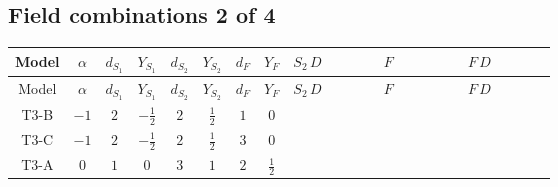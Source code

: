 \documentclass[8pt]{article}
\begin{document}
\begin{landscape}
\subsection*{Field combinations 2 of 4}
\begin{longtable}{@{}cccccccc >{\raggedright\arraybackslash}p{0.21\linewidth} >{\raggedright\arraybackslash}p{0.21\linewidth} >{\raggedright\arraybackslash}p{0.21\linewidth}@{}}
\toprule
Model & $\alpha$ & $d_{S_1}$ & $Y_{S_1}$ & $d_{S_2}$ & $Y_{S_2}$ & $d_F$ & $Y_F$ & $S_2\,D$ & $F$ & $F\,D$ \\
\midrule
\endfirsthead
\toprule
Model & $\alpha$ & $d_{S_1}$ & $Y_{S_1}$ & $d_{S_2}$ & $Y_{S_2}$ & $d_F$ & $Y_F$ & $S_2\,D$ & $F$ & $F\,D$ \\
\midrule
\endhead
T3-B & $-1$ & $2$ & $-\frac{1}{2}$ & $2$ & $\frac{1}{2}$ & $1$ & $0$ & \scriptsize\adjustbox{max width=\linewidth}{$\begin{gathered} +D_{\mu _1}\left(S_{2,j_1}\right){}^{\dagger } D_{\mu _1}\left(S_{2,j_1}\right)\end{gathered}$} & \scriptsize\adjustbox{max width=\linewidth}{$\begin{gathered} -\frac{1}{2} F_{r_1}{}^T\, C\, F_{r_1} M_F\end{gathered}$} & \scriptsize\adjustbox{max width=\linewidth}{$\begin{gathered} +\frac{1}{2} i F_{r_1}{}^T\, C\, \gamma ^{\mu _1}\, D_{\mu _1}\left(F_{r_1}\right)\end{gathered}$} \\
\midrule
T3-C & $-1$ & $2$ & $-\frac{1}{2}$ & $2$ & $\frac{1}{2}$ & $3$ & $0$ & \scriptsize\adjustbox{max width=\linewidth}{$\begin{gathered} +D_{\mu _1}\left(S_{2,j_1}\right){}^{\dagger } D_{\mu _1}\left(S_{2,j_1}\right)\end{gathered}$} & \scriptsize\adjustbox{max width=\linewidth}{$\begin{gathered} -\frac{1}{2} F_{j_1,r_1}{}^T\, C\, F_{j_1,r_1} M_F\end{gathered}$} & \scriptsize\adjustbox{max width=\linewidth}{$\begin{gathered} +\frac{1}{2} i F_{j_1,r_1}{}^T\, C\, \gamma ^{\mu _1}\, D_{\mu _1}\left(F_{j_1,r_1}\right)\end{gathered}$} \\
\midrule
T3-A & $0$ & $1$ & $0$ & $3$ & $1$ & $2$ & $\frac{1}{2}$ & \scriptsize\adjustbox{max width=\linewidth}{$\begin{gathered} +D_{\mu _1}\left(S_{2,j_1}\right){}^{\dagger } D_{\mu _1}\left(S_{2,j_1}\right)\end{gathered}$} & \scriptsize\adjustbox{max width=\linewidth}{$\begin{gathered} -\overline{F_{j_1,r_1}}\, F_{j_1,r_1} M_F\end{gathered}$} & \scriptsize\adjustbox{max width=\linewidth}{$\begin{gathered} +i \overline{F_{j_1,r_1}}\, \gamma ^{\mu _1}\, D_{\mu _1}\left(F_{j_1,r_1}\right)\end{gathered}$} \\

\end{longtable}
\end{landscape}
\end{document}
